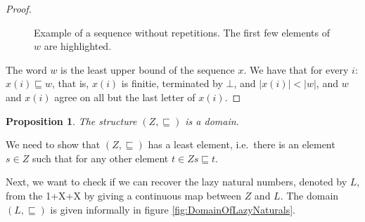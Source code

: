 \documentclass[a4paper]{article}
\newtheorem{thmPONuFisADomain}[defNuF]{Proposition}
\begin{document}
\begin{proof}
\begin{figure}
\begin{center}
\end{center}
\caption{Example of a sequence without repetitions. The first few elements of
$w$ are highlighted.}
\label{fig:exampleXprime}
\end{figure}

The word $w$ is the least upper bound of the sequence $x$. We have that for
every $i$: $x(i) \sqsubseteq w$, that is, $x(i)$ is finitie, terminated by
$\bot$, and $|x(i)| < |w|$, and $w$ and $x(i)$ agree on all but the last letter
of $x(i)$.

\end{proof}


\begin{thmPONuFisADomain}

The structure $(Z, \sqsubseteq)$ is a domain.

\end{thmPONuFisADomain}

We need to show that $(Z, \sqsubseteq)$ has a least element, i.e.~there is
an element $s \in Z$ such that for any other element $t \in Z s
\sqsubseteq t$.

Next, we want to check if we can recover the lazy natural numbers, denoted by
$L$, from the 1+X+X by giving a continuous map between $Z$ and $L$.
The domain $(L, \sqsubseteq)$ is given informally in figure
\ref{fig:DomainOfLazyNaturals}.

\end{document}
